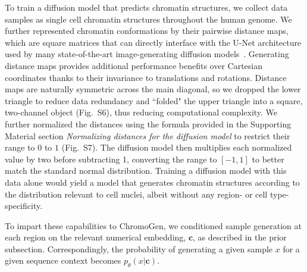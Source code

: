 \documentclass[12pt,letterpaper]{article}
\begin{document}
To train a diffusion model that predicts chromatin structures, we collect data samples as single cell chromatin structures throughout the human genome. We further represented chromatin conformations by their pairwise distance maps, which are square matrices that can directly interface with the U-Net architecture used by many state-of-the-art image-generating diffusion models~\cite{Dhariwal2021, Saharia2022, rombach_high-resolution_2022}. %
Generating distance maps provides additional performance benefits over Cartesian coordinates thanks to their invariance to translations and rotations. 
Distance maps are naturally symmetric across the main diagonal, so we dropped the lower triangle to reduce data redundancy and ``folded" the upper triangle into a square, two-channel object (Fig.~S6), thus reducing computational complexity. 
We further normalized the distances using the formula provided in the Supporting Material section \emph{Normalizing distances for the diffusion model} to restrict their range to $0$ to $1$ (Fig.~S7).
The diffusion model then multiplies each normalized value by two before subtracting 1, converting the range to $[-1,1]$ to better match the standard normal distribution.  
Training a diffusion model with this data alone would yield a model that generates chromatin structures according to the distribution relevant to cell nuclei, albeit without any region- or cell type-specificity. 

To impart these capabilities to ChromoGen, we conditioned sample generation at each region on the relevant numerical embedding, $\boldsymbol{c}$, as described in the prior subsection. 
Correspondingly, the probability of generating a given sample $x$ for a given sequence context becomes $p_\theta(x|\boldsymbol{c})$.  
\end{document}
